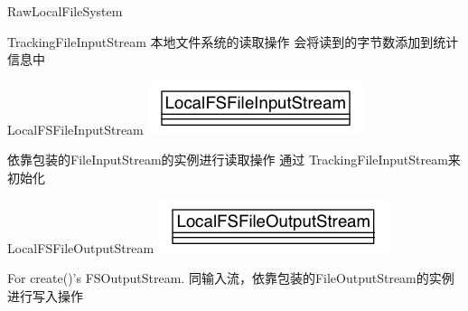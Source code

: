 \begin{XeClass}{RawLocalFileSystem}
\begin{XeInnerClass}{TrackingFileInputStream}
 本地文件系统的读取操作
 会将读到的字节数添加到统计信息中

    \end{XeInnerClass}
    \begin{XeInnerClass}{LocalFSFileInputStream}
\includegraphics[width=\textwidth]{cdig/LocalFSFileInputStream.png}
         
 依靠包装的FileInputStream的实例进行读取操作
 通过 TrackingFileInputStream来初始化

    \end{XeInnerClass}
    \begin{XeInnerClass}{LocalFSFileOutputStream}
\includegraphics[width=\textwidth]{cdig/LocalFSFileOutputStream.png}
         
 For create()'s FSOutputStream.
 同输入流，依靠包装的FileOutputStream的实例进行写入操作

    \end{XeInnerClass}

\end{XeClass}
